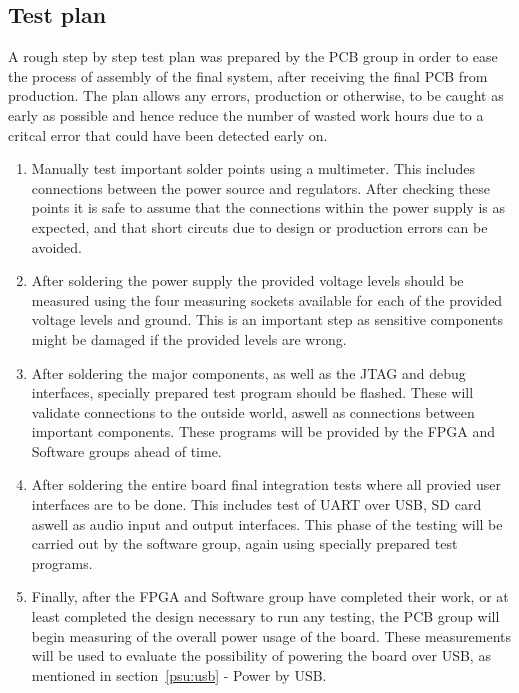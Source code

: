 \subsection{Test plan}

A rough step by step test plan was prepared by the PCB group in order to ease
the process of assembly of the final system, after receiving
the final PCB from production. The plan allows any errors, production or
otherwise, to be caught as early as possible and hence reduce the number of
wasted work hours due to a critcal error that could have been detected early
on.

\begin{enumerate}
    \item Manually test important solder points using a multimeter. This 
    includes connections between the power source and regulators. After 
    checking these points it is safe to assume that the connections within
    the power supply is as expected, and that short circuts due to design
    or production errors can be avoided.
    \item After soldering the power supply the provided voltage levels should
    be measured using the four measuring sockets available for each of the
    provided voltage levels and ground. This is an important step as sensitive
    components might be damaged if the provided levels are wrong. 
    \item After soldering the major components, as well as the JTAG and debug
    interfaces, specially prepared test program should be flashed. These will
    validate connections to the outside world, aswell as connections between 
    important components. These programs will be provided by the FPGA and 
    Software groups ahead of time.
    \item After soldering the entire board final integration tests where all
    provied user interfaces are to be done. This includes test of UART over 
    USB, SD card aswell as audio input and output interfaces. This phase of 
    the testing will be carried out by the software group, again using specially
    prepared test programs.
    \item Finally, after the FPGA and Software group have completed their work,
    or at least completed the design necessary to run any testing, the PCB group
    will begin measuring of the overall power usage of the board. These measurements
    will be used to evaluate the possibility of powering the board over USB, as 
    mentioned in section~\ref{psu:usb} - Power by USB.
\end{enumerate}
